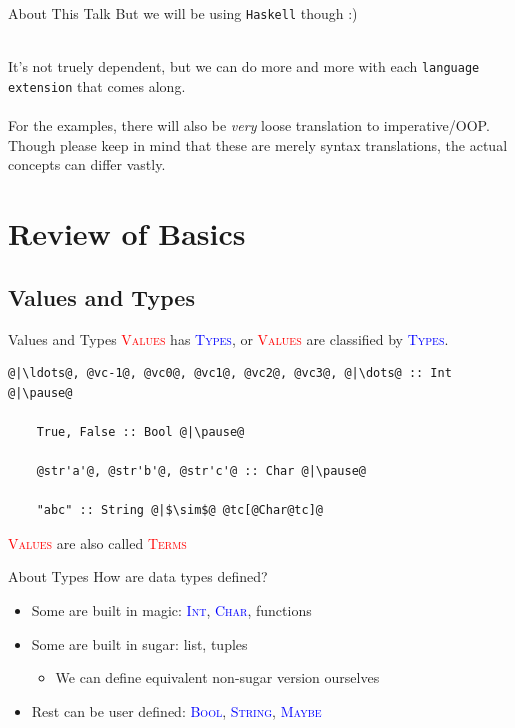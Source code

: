 \documentclass[xcolor={usenames,dvipsnames}]{beamer}
\newcommand{\htycon}[1]{\textcolor{Blue}{\textsc{#1}}}
\newcommand{\hvalcon}[1]{\textcolor{Red}{\textsc{#1}}}
\begin{document}
\begin{frame}{About This Talk}
  But we will be using \texttt{Haskell} though :)

  \ \\
  \pause
  It's not truely dependent, but we can do more and more with each \texttt{language extension} that comes along.\\

  \ \\
  \pause
  For the examples, there will also be \textit{very} loose translation to imperative/OOP. Though please keep in mind that these are merely syntax translations, the actual concepts can differ vastly.
\end{frame}


\section{Review of Basics}

\subsection{Values and Types}

\begin{frame}[fragile]{Values and Types}
  \hvalcon{Values} has \htycon{Types}, or \hvalcon{Values} are classified by \htycon{Types}.\\

  \begin{lstlisting}[style=hask]
    @|\ldots@, @vc-1@, @vc0@, @vc1@, @vc2@, @vc3@, @|\dots@ :: Int @|\pause@

    True, False :: Bool @|\pause@

    @str'a'@, @str'b'@, @str'c'@ :: Char @|\pause@

    "abc" :: String @|$\sim$@ @tc[@Char@tc]@

  \end{lstlisting}

  \tiny{\hvalcon{Values} are also called \hvalcon{Terms}}
\end{frame}

\begin{frame}[fragile]{About Types}
  How are data types defined?\\
  \pause
  \begin{itemize}
    \item Some are built in magic: \htycon{Int}, \htycon{Char}, functions
    \pause
    \item Some are built in sugar: list, tuples
      \begin{itemize}
        \item We can define equivalent non-sugar version ourselves
      \end{itemize}
    \pause
    \item Rest can be user defined: \htycon{Bool}, \htycon{String}, \htycon{Maybe}
  \end{itemize}
\end{frame}
\end{document}
